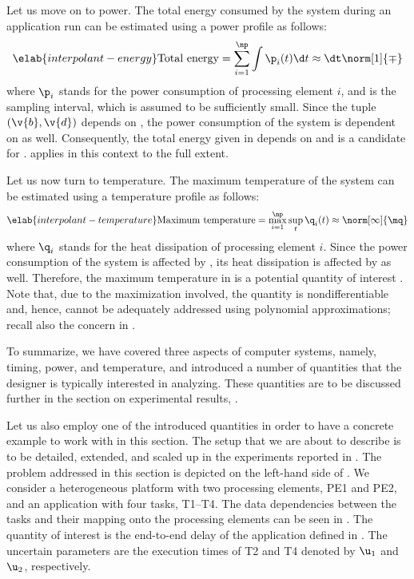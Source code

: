 Let us move on to power. The total energy consumed by the system during an
application run can be estimated using a power profile \mp as follows:
\begin{equation} \elab{interpolant-energy}
  \text{Total energy}
  = \sum_{i = 1}^\np \int \p_i(t) \d t
  \approx \dt \norm[1]{\mp}
\end{equation}
where $\p_i$ stands for the power consumption of processing element $i$, and \dt
is the sampling interval, which is assumed to be sufficiently small. Since the
tuple $(\v{b}, \v{d})$ depends on \vu, the power consumption of the system is
dependent on \vu as well. Consequently, the total energy given in
 depends on \vu and is a candidate for \g.
 applies in this context to the full extent.

Let us now turn to temperature. The maximum temperature of the system can be
estimated using a temperature profile \mq as follows:
\begin{equation} \elab{interpolant-temperature}
  \text{Maximum temperature}
  = \max_{i = 1}^\np \sup_{t} \q_i(t)
  \approx \norm[\infty]{\mq}
\end{equation}
where $\q_i$ stands for the heat dissipation of processing element $i$. Since
the power consumption of the system is affected by \vu, its heat dissipation is
affected by \vu as well. Therefore, the maximum temperature in
 is a potential quantity of interest \g. Note
that, due to the maximization involved, the quantity is nondifferentiable and,
hence, cannot be adequately addressed using polynomial approximations; recall
also the concern in .

To summarize, we have covered three aspects of computer systems, namely, timing,
power, and temperature, and introduced a number of quantities that the designer
is typically interested in analyzing. These quantities are to be discussed
further in the section on experimental results, .

Let us also employ one of the introduced quantities in order to have a concrete
example to work with in this section. The setup that we are about to describe is
to be detailed, extended, and scaled up in the experiments reported in
. The problem addressed in this section is depicted on
the left-hand side of . We consider a
heterogeneous platform with two processing elements, PE1 and PE2, and an
application with four tasks, T1--T4. The data dependencies between the tasks and
their mapping onto the processing elements can be seen in
. The quantity of interest \g is the end-to-end
delay of the application defined in . The uncertain
parameters \vu are the execution times of T2 and T4 denoted by $\u_1$ and
$\u_2$, respectively.

